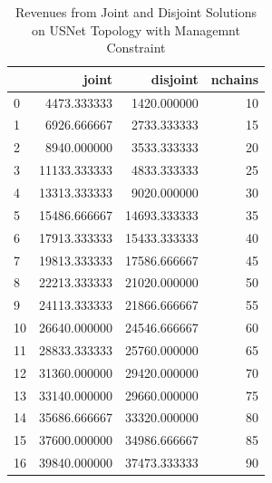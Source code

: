 \begin{table}[H]
    \caption{Revenues from Joint and Disjoint Solutions on USNet Topology with Managemnt Constraint}
    \label{tbl:joint-vs-disjoin-usnet-2}
    \medskip
    \centering
    \begin{tabular}{lrrr}
        \toprule
        {} &         joint &      disjoint &  nchains \\
        \midrule
        0  &   4473.333333 &   1420.000000 &       10 \\
        1  &   6926.666667 &   2733.333333 &       15 \\
        2  &   8940.000000 &   3533.333333 &       20 \\
        3  &  11133.333333 &   4833.333333 &       25 \\
        4  &  13313.333333 &   9020.000000 &       30 \\
        5  &  15486.666667 &  14693.333333 &       35 \\
        6  &  17913.333333 &  15433.333333 &       40 \\
        7  &  19813.333333 &  17586.666667 &       45 \\
        8  &  22213.333333 &  21020.000000 &       50 \\
        9  &  24113.333333 &  21866.666667 &       55 \\
        10 &  26640.000000 &  24546.666667 &       60 \\
        11 &  28833.333333 &  25760.000000 &       65 \\
        12 &  31360.000000 &  29420.000000 &       70 \\
        13 &  33140.000000 &  29660.000000 &       75 \\
        14 &  35686.666667 &  33320.000000 &       80 \\
        15 &  37600.000000 &  34986.666667 &       85 \\
        16 &  39840.000000 &  37473.333333 &       90 \\
        \bottomrule
    \end{tabular}
\end{table}

